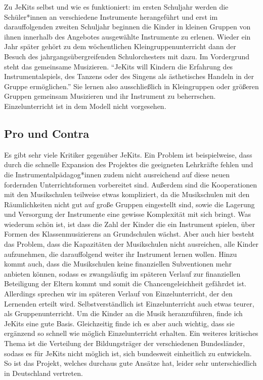 Zu JeKits selbst und wie es funktioniert: im ersten Schuljahr werden die
Schüler*innen an verschiedene Instrumente herangeführt und erst im
darauffolgenden zweiten Schuljahr beginnen die Kinder in kleinen Gruppen von
ihnen innerhalb des Angebotes ausgewählte Instrumente zu erlenen. Wieder ein
Jahr später gehört zu dem wöchentlichen Kleingruppenunterricht dann der Besuch
des jahrgangsübergreifenden Schulorchesters mit dazu. Im Vordergrund steht das
gemeinsame Musizieren. \enquote{JeKits will Kindern die Erfahrung des
Instrumentalspiels, des Tanzens oder des Singens als ästhetisches Handeln in der
Gruppe ermöglichen.}
\autocite{https://de.wikipedia.org/wiki/JeKits}
Sie lernen also ausschließlich in Kleingruppen oder größeren Gruppen gemeinsam
Musizieren und ihr Instrument zu beherrschen. Einzelunterricht ist in dem Modell
nicht vorgesehen.


\subsection{Pro und Contra}
Es gibt sehr viele Kritiker gegenüber JeKits. Ein Problem ist beispielweise,
dass durch die schnelle Expansion des Projektes die geeigneten Lehrkräfte fehlen
und die Instrumentalpädagog*innen zudem nicht ausreichend auf diese neuen
fordernden Unterrichtsformen vorbereitet sind. Außerdem sind die Kooperationen
mit den Musikschulen teilweise etwas kompliziert, da die Musikschulen mit den
Räumlichkeiten nicht gut auf große Gruppen eingestellt sind, sowie die Lagerung
und Versorgung der Instrumente eine gewisse Komplexität mit sich bringt. Was
wiederum schön ist, ist dass die Zahl der Kinder die ein Instrument spielen,
über Formen des Klassenmusizierens an Grundschulen wächst.
\autocite[119]{ernst:die_zukunftsfaehige_musikschule} Aber auch hier besteht das
Problem, dass die Kapazitäten der Musikschulen nicht ausreichen, alle Kinder
aufzunehmen, die darauffolgend weiter ihr Instrument lernen wollen. Hinzu kommt
auch, dass die Musikschulen keine finanziellen Subventionen mehr anbieten
können, sodass es zwangsläufig im späteren Verlauf zur finanziellen Beteiligung
der Eltern kommt und somit die Chancengeleichheit gefährdet ist. Allerdings
sprechen wir im späteren Verlauf von Einzelunterricht, der den Lernenden erteilt
wird. Selbstverständlich ist Einzelunterricht auch etwas teurer, als
Gruppenunterricht. Um die Kinder an die Musik heranzuführen, finde ich JeKits
eine gute Basis. Gleichzeitig finde ich es aber auch wichtig, dass sie ergänzend
so schnell wie möglich Einzelunterricht erhalten. Ein weiteres kritisches Thema
ist die Verteilung der Bildungsträger der verschiedenen Bundesländer, sodass es
für JeKits nicht möglich ist, sich bundesweit einheitlich zu entwickeln. So ist
das Projekt, welches durchaus gute Ansätze hat, leider sehr unterschiedlich in
Deutschland vertreten. 

